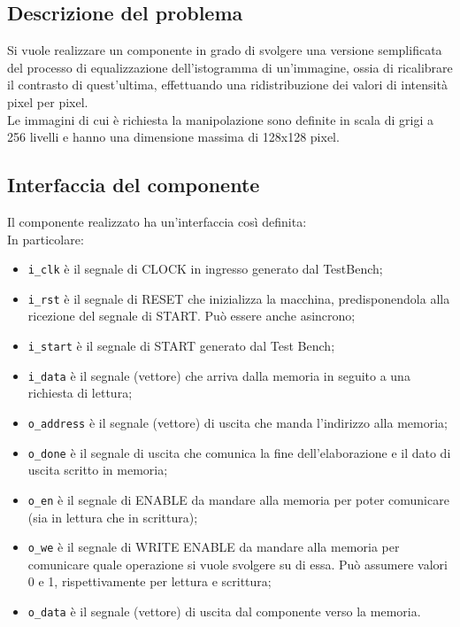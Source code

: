\documentclass{article}
\begin{document}
\subsection{Descrizione del problema} %
Si vuole realizzare un componente in grado di svolgere una versione semplificata del processo di equalizzazione dell’istogramma di un’immagine, ossia di ricalibrare il contrasto di quest’ultima, effettuando una ridistribuzione dei valori di intensità pixel per pixel. \\
Le immagini di cui è richiesta la manipolazione sono definite in scala di grigi a 256 livelli e hanno una dimensione massima di 128x128 pixel.

\subsection{Interfaccia del componente}
Il componente realizzato ha un’interfaccia così definita: \\


\noindent In particolare:
\begin{itemize}
    \item \texttt{i\_clk} è il segnale di CLOCK in ingresso generato dal TestBench;
    \item \texttt{i\_rst} è il segnale di RESET che inizializza la macchina, predisponendola alla ricezione del segnale di START. Può essere anche asincrono;
    \item \texttt{i\_start} è il segnale di START generato dal Test Bench;
    \item \texttt{i\_data} è il segnale (vettore) che arriva dalla memoria in seguito a una richiesta di lettura;
    \item \texttt{o\_address} è il segnale (vettore) di uscita che manda l’indirizzo alla memoria;
    \item \texttt{o\_done} è il segnale di uscita che comunica la fine dell’elaborazione e il dato di uscita scritto in memoria;
    \item \texttt{o\_en} è il segnale di ENABLE da mandare alla memoria per poter comunicare (sia in lettura che in scrittura);
    \item \texttt{o\_we} è il segnale di WRITE ENABLE da mandare alla memoria per comunicare quale operazione si vuole svolgere su di essa. Può assumere valori 0 e 1, rispettivamente per lettura e scrittura;
    \item \texttt{o\_data} è il segnale (vettore) di uscita dal componente verso la memoria.
\end{itemize}
\end{document}
